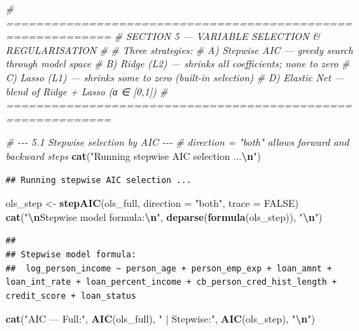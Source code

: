 \documentclass[
]{article}
\newenvironment{Shaded}{\begin{snugshade}}{\end{snugshade}}
\newcommand{\AttributeTok}[1]{\textcolor[rgb]{0.13,0.29,0.53}{#1}}
\newcommand{\CommentTok}[1]{\textcolor[rgb]{0.56,0.35,0.01}{\textit{#1}}}
\newcommand{\ConstantTok}[1]{\textcolor[rgb]{0.56,0.35,0.01}{#1}}
\newcommand{\FunctionTok}[1]{\textcolor[rgb]{0.13,0.29,0.53}{\textbf{#1}}}
\newcommand{\NormalTok}[1]{#1}
\newcommand{\OtherTok}[1]{\textcolor[rgb]{0.56,0.35,0.01}{#1}}
\newcommand{\SpecialCharTok}[1]{\textcolor[rgb]{0.81,0.36,0.00}{\textbf{#1}}}
\newcommand{\StringTok}[1]{\textcolor[rgb]{0.31,0.60,0.02}{#1}}
\begin{document}
\begin{Shaded}
\begin{Highlighting}[]
\CommentTok{\# ============================================================}
\CommentTok{\#  SECTION 5 — VARIABLE SELECTION \& REGULARISATION}
\CommentTok{\#}
\CommentTok{\#  Three strategies:}
\CommentTok{\#    A) Stepwise AIC  — greedy search through model space}
\CommentTok{\#    B) Ridge (L2)    — shrinks all coefficients; none to zero}
\CommentTok{\#    C) Lasso (L1)    — shrinks some to zero (built{-}in selection)}
\CommentTok{\#    D) Elastic Net   — blend of Ridge + Lasso (α ∈ [0,1])}
\CommentTok{\# ============================================================}

\CommentTok{\# {-}{-}{-} 5.1  Stepwise selection by AIC {-}{-}{-}}
\CommentTok{\# direction = "both" allows forward and backward steps}
\FunctionTok{cat}\NormalTok{(}\StringTok{"Running stepwise AIC selection ...}\SpecialCharTok{\textbackslash{}n}\StringTok{"}\NormalTok{)}
\end{Highlighting}
\end{Shaded}

\begin{verbatim}
## Running stepwise AIC selection ...
\end{verbatim}

\begin{Shaded}
\begin{Highlighting}[]
\NormalTok{ols\_step }\OtherTok{\textless{}{-}} \FunctionTok{stepAIC}\NormalTok{(ols\_full, }\AttributeTok{direction =} \StringTok{"both"}\NormalTok{, }\AttributeTok{trace =} \ConstantTok{FALSE}\NormalTok{)}
\FunctionTok{cat}\NormalTok{(}\StringTok{"}\SpecialCharTok{\textbackslash{}n}\StringTok{Stepwise model formula:}\SpecialCharTok{\textbackslash{}n}\StringTok{"}\NormalTok{, }\FunctionTok{deparse}\NormalTok{(}\FunctionTok{formula}\NormalTok{(ols\_step)), }\StringTok{"}\SpecialCharTok{\textbackslash{}n}\StringTok{"}\NormalTok{)}
\end{Highlighting}
\end{Shaded}

\begin{verbatim}
## 
## Stepwise model formula:
##  log_person_income ~ person_age + person_emp_exp + loan_amnt +      loan_int_rate + loan_percent_income + cb_person_cred_hist_length +      credit_score + loan_status
\end{verbatim}

\begin{Shaded}
\begin{Highlighting}[]
\FunctionTok{cat}\NormalTok{(}\StringTok{"AIC — Full:"}\NormalTok{, }\FunctionTok{AIC}\NormalTok{(ols\_full), }\StringTok{" | Stepwise:"}\NormalTok{, }\FunctionTok{AIC}\NormalTok{(ols\_step), }\StringTok{"}\SpecialCharTok{\textbackslash{}n}\StringTok{"}\NormalTok{)}
\end{Highlighting}
\end{Shaded}
\end{document}
